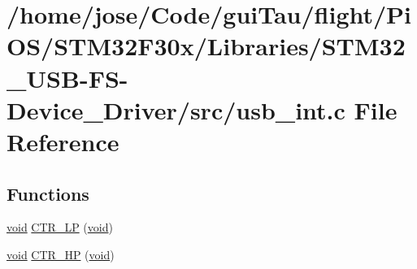 \hypertarget{_s_t_m32_f30x_2_libraries_2_s_t_m32___u_s_b-_f_s-_device___driver_2src_2usb__int_8c}{\section{/home/jose/\-Code/gui\-Tau/flight/\-Pi\-O\-S/\-S\-T\-M32\-F30x/\-Libraries/\-S\-T\-M32\-\_\-\-U\-S\-B-\/\-F\-S-\/\-Device\-\_\-\-Driver/src/usb\-\_\-int.c File Reference}
\label{_s_t_m32_f30x_2_libraries_2_s_t_m32___u_s_b-_f_s-_device___driver_2src_2usb__int_8c}
}
\subsection*{Functions}
\begin{DoxyCompactItemize}
\item 
\hyperlink{group___n_a_m_e_ga18028b8badbf1ea7e704ccac3c488e82}{void} \hyperlink{_s_t_m32_f30x_2_libraries_2_s_t_m32___u_s_b-_f_s-_device___driver_2src_2usb__int_8c_a54fd7cf2d74fb113dbd2f203568fa083}{C\-T\-R\-\_\-\-L\-P} (\hyperlink{group___n_a_m_e_ga18028b8badbf1ea7e704ccac3c488e82}{void})
\item 
\hyperlink{group___n_a_m_e_ga18028b8badbf1ea7e704ccac3c488e82}{void} \hyperlink{_s_t_m32_f30x_2_libraries_2_s_t_m32___u_s_b-_f_s-_device___driver_2src_2usb__int_8c_a40276e5c399fe32d6c0ef437266693c9}{C\-T\-R\-\_\-\-H\-P} (\hyperlink{group___n_a_m_e_ga18028b8badbf1ea7e704ccac3c488e82}{void})
\end{DoxyCompactItemize}
